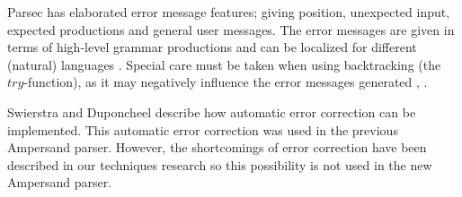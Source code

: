 Parsec has elaborated error message features; giving position, unexpected input, expected productions and general user messages.
The error messages are given in terms of high-level grammar productions and can be localized for different (natural) languages .
Special care must be taken when using backtracking (the $try$-function), as it may negatively influence the error messages generated ,  .

Swierstra and Duponcheel  describe how automatic error correction can be implemented.
This automatic error correction was used in the previous Ampersand parser.
However, the shortcomings of error correction have been described in our techniques research \cite{parsing} so this possibility is not used in the new Ampersand parser.
